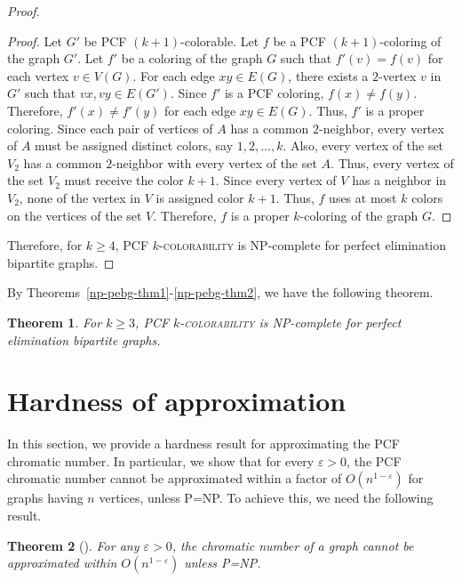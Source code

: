 \documentclass[11pt]{article}
\theoremstyle{plain}
\newtheorem{theorem}{Theorem}
\begin{document}
\begin{proof}
\begin{proof}
			Let $G'$ be PCF $(k+1)$-colorable. Let $f$ be a PCF $(k+1)$-coloring of the graph $G'$. Let $f'$ be a coloring of the graph $G$ such that $f'(v) = f(v)$ for each vertex $v\in V(G)$. For each edge $xy\in E(G)$, there exists a $2$-vertex $v$ in $G'$ such that $vx, vy\in E(G')$. Since $f'$ is a PCF coloring, $f(x)\neq f(y)$. Therefore, $f'(x) \neq f'(y)$ for each edge $xy\in E(G)$. Thus, $f'$ is a proper coloring. Since each pair of vertices of $A$ has a common $2$-neighbor, every vertex of $A$ must be assigned distinct colors, say $1, 2, \ldots, k$. Also, every vertex of the set $V_2$ has a common $2$-neighbor with every vertex of the set $A$. Thus, every vertex of the set $V_2$ must receive the color $k+1$. Since every vertex of $V$ has a neighbor in $V_2$, none of the vertex in $V$ is assigned color $k+1$. Thus, $f$ uses at most $k$ colors on the vertices of the set $V$. Therefore, $f$ is a proper $k$-coloring of the graph $G$.
		\end{proof}
		Therefore, for $k\geq 4$, PCF $k$-\textsc{colorability} is NP-complete for perfect elimination bipartite graphs.
	\end{proof}
	
	By Theorems~\ref{np-pebg-thm1}-\ref{np-pebg-thm2}, we have the following theorem.
	
	\begin{theorem}
		For $k\geq 3$,	PCF $k$-\textsc{colorability} is NP-complete for perfect elimination bipartite graphs.
	\end{theorem}
	
	\section{Hardness of approximation}
	
	In this section, we provide a hardness result for approximating the PCF chromatic number. In particular, we show that for every $\varepsilon>0$, the PCF chromatic number cannot be approximated  within a factor of $O(n^{1-\varepsilon})$ for graphs having $n$ vertices, unless P=NP. To achieve this, we need the following result. 
	
	\begin{theorem}[\cite{Zuckerman}]\label{chromaticnumber}
		For any $\varepsilon > 0$, the chromatic number of a graph cannot be approximated within $O(n^{1-\varepsilon})$ unless P=NP.
	\end{theorem}
	
\end{document}
